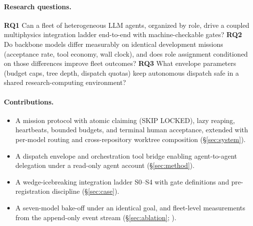 \paragraph{Research questions.}
\textbf{RQ1} Can a fleet of heterogeneous LLM agents, organized by
role, drive a coupled multiphysics integration ladder end-to-end with
machine-checkable gates? \textbf{RQ2} Do backbone models differ
measurably on identical development missions (acceptance rate, tool
economy, wall clock), and does role assignment conditioned on those
differences improve fleet outcomes? \textbf{RQ3} What envelope
parameters (budget caps, tree depth, dispatch quotas) keep autonomous
dispatch safe in a shared research-computing environment?

\paragraph{Contributions.}
\begin{itemize}
\item A mission protocol with atomic claiming (SKIP LOCKED), lazy
reaping, heartbeats, bounded budgets, and terminal human acceptance,
extended with per-model routing and cross-repository worktree
composition (\S\ref{sec:system}).
\item A dispatch envelope and orchestration tool bridge enabling
agent-to-agent delegation under a read-only agent account
(\S\ref{sec:method}).
\item A wedge-icebreaking integration ladder S0--S4 with gate
definitions and pre-registration discipline (\S\ref{sec:case}).
\item A seven-model bake-off under an identical goal, and fleet-level
measurements from the append-only event stream (\S\ref{sec:ablation};
).
\end{itemize}
